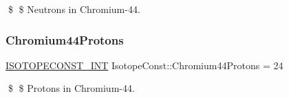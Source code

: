 \$ \$ Neutrons in Chromium-\/44. \mbox{\label{group___isotope_const-_chromium-_cr44_ga537a8f13ff149e6e9910958f7723be74}} 
\subsubsection{\texorpdfstring{Chromium44\+Protons}{Chromium44Protons}}
{\footnotesize\ttfamily \mbox{\hyperlink{group___isotope_const-_macros_ga5f18360b3e99483a35c32d789e62621c}{I\+S\+O\+T\+O\+P\+E\+C\+O\+N\+S\+T\+\_\+\+I\+NT}} Isotope\+Const\+::\+Chromium44\+Protons = 24}

\$ \$ Protons in Chromium-\/44. 